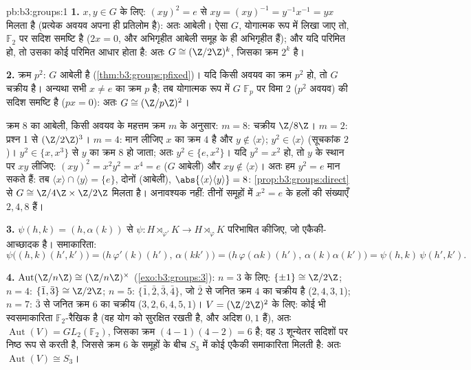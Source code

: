 \begin{solution}{pb:b3:groups:1}
\textbf{1.} $x, y \in G$ के लिए: $(xy)^2 = e$ से $xy = (xy)^{-1} =
y^{-1}x^{-1} = yx$ मिलता है (प्रत्येक अवयव
अपना ही प्रतिलोम है): अतः आबेली। ऐसा $G$, योगात्मक रूप में लिखा
जाए तो, $\mathbb
F_2$ पर सदिश समष्टि है ($2x = 0$, और अभिगृहीत आबेली समूह के
ही अभिगृहीत हैं); और यदि परिमित हो, तो उसका कोई परिमित आधार होता
है: अतः $G \cong (\Z/2\Z)^k$, जिसका क्रम $2^k$ है।

\textbf{2.} क्रम $p^2$: $G$ आबेली है (\cref{thm:b3:groups:pfixed})। यदि किसी अवयव का
क्रम $p^2$ हो, तो $G$ चक्रीय है। अन्यथा सभी $x \neq e$ का क्रम $p$
है; तब योगात्मक रूप में $G$ $\mathbb F_p$ पर विमा $2$ ($p^2$ अवयव) की
सदिश समष्टि है ($px = 0$): अतः $G \cong (\Z/p\Z)^2$।

क्रम $8$ का आबेली, किसी अवयव के महत्तम क्रम $m$ के अनुसार:
$m =
8$: चक्रीय $\Z/8\Z$। $m = 2$: प्रश्न 1 से $(\Z/2\Z)^3$। $m = 4$: मान लीजिए
$x$ का क्रम $4$ है और $y \notin \langle x \rangle$; $y^2 \in
\langle x\rangle$ (सूचकांक $2$)। $y^2 \in \{x, x^3\}$ से
$y$ का क्रम $8$ हो जाता; अतः $y^2 \in \{e, x^2\}$। यदि $y^2 = x^2$ हो, तो $y$ के
स्थान पर $xy$ लीजिए: $(xy)^2 = x^2y^2 = x^4 = e$ ($G$ आबेली) और $xy \notin
\langle x\rangle$। अतः हम $y^2 = e$
मान सकते हैं: तब $\langle x
\rangle \cap \langle y \rangle = \{e\}$, दोनों  (आबेली), $\abs{\langle x\rangle \langle y\rangle} = 8$:
\cref{prop:b3:groups:direct} से $G \cong \Z/4\Z \times \Z/2\Z$ मिलता है। अनावश्यक नहीं: तीनों समूहों में $x^2 = e$ के
हलों की संख्याएँ $2, 4, 8$ हैं।

\textbf{3.} $\psi(h, k) = (h, \alpha(k))$ से $\psi \colon H \rtimes_{\varphi'} K \to H
\rtimes_{\varphi} K$ परिभाषित कीजिए, जो एकैकी-आच्छादक है।
समाकारिता:
\[
\psi\bigl((h,k)(h',k')\bigr)
= \bigl(h\,\varphi'(k)(h'),\, \alpha(kk')\bigr)
= \bigl(h\,\varphi(\alpha k)(h'),\, \alpha(k)\alpha(k')\bigr)
= \psi(h,k)\,\psi(h',k').
\]

\textbf{4.} $\operatorname{Aut}(\Z/n\Z) \cong (\Z/n\Z)^\times$ (\cref{exo:b3:groups:3}): $n = 3$ के लिए: $\{\pm 1\} \cong \Z/2\Z$; $n = 4$: $\{\bar 1, \bar 3\} \cong \Z/2\Z$;
$n = 5$: $\{\bar 1,
\bar 2, \bar 3, \bar 4\}$, जो $\bar
2$ से जनित क्रम $4$ का चक्रीय है ($2, 4, 3, 1$);
$n = 7$: $\bar
3$ से जनित क्रम $6$ का चक्रीय ($3, 2, 6, 4, 5, 1$)। $V = (\Z/2\Z)^2$ के लिए:
कोई भी स्वसमाकारिता $\mathbb F_2$-रैखिक है (वह योग को सुरक्षित रखती है, और
अदिश $0,
1$ हैं), अतः $\operatorname{Aut}(V) = GL_2(\mathbb F_2)$, जिसका क्रम $(4-1)(4-2) = 6$ है; वह $3$ शून्येतर
सदिशों पर निष्ठ रूप से  करती है, जिससे क्रम $6$ के समूहों
के बीच $S_3$ में कोई एकैकी समाकारिता मिलती है: अतः $\operatorname{Aut}(V) \cong S_3$।


\end{solution}
